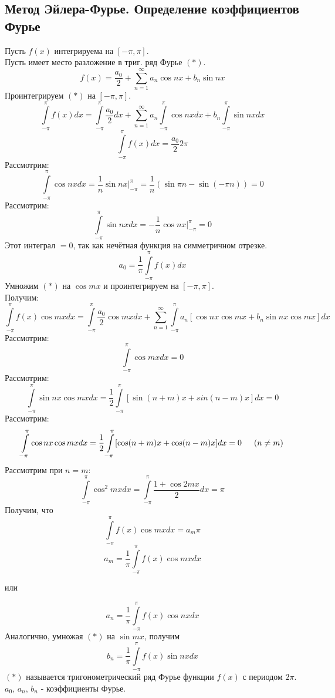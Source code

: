 \documentclass[12pt]{article}
\let\oldint\int
\let\oldsum\sum
\renewcommand{\int}{\oldint\limits}
\renewcommand{\sum}{\oldsum\limits}
\begin{document}
    \subsection{Метод Эйлера-Фурье. Определение коэффициентов Фурье}\noindent
    Пусть $f(x)$ интегрируема на $[-\pi, \pi]$.\\
    Пусть имеет место разложение в триг. ряд Фурье $(*)$.
    \[ f(x) = \frac{a_0}{2} + \sum_{n=1}^{\infty} a_n \cos nx + b_n \sin nx \]
    Проинтегрируем $(*)$ на $[-\pi, \pi]$.
    \[ \int_{-\pi}^{\pi} f(x)dx = \int_{-\pi}^{\pi} \frac{a_0}{2} dx + \sum_{n=1}^{\infty} a_n \int_{-\pi}^{\pi} \cos nx dx + b_n \int_{-\pi}^{\pi} \sin nx dx \]
    \[ \int_{-\pi}^{\pi} f(x)dx = \frac{a_0}{2} 2\pi \]
    Рассмотрим:
    \[ \int_{-\pi}^{\pi} \cos nx dx = \frac{1}{n} \sin nx \Big|^{\pi}_{-\pi} = \frac{1}{n} (\sin \pi n - \sin (-\pi n)) = 0 \]
    Рассмотрим:
    \[ \int_{-\pi}^{\pi} \sin nx dx = -\frac{1}{n} \cos nx \Big|^{\pi}_{-\pi} = 0 \]
    Этот интеграл $=0$, так как нечётная функция на симметричном отрезке.
    \[ a_0 = \frac{1}{\pi} \int_{-\pi}^{\pi} f(x) dx \]
    Умножим $(*)$ на $\cos mx$ и проинтегрируем на $[-\pi, \pi]$.\\
    Получим:
    \[ \int_{-\pi}^{\pi} f(x) \cos mx dx = \int_{-\pi}^{\pi} \frac{a_0}{2} \cos mx dx + \sum_{n=1}^{\infty} \int_{-\pi}^{\pi} a_n [ \cos nx \cos mx + b_n \sin nx \cos mx ]dx \]
    Рассмотрим:
    \[ \int_{-\pi}^{\pi} \cos mx dx = 0 \]
    Рассмотрим:
    \[ \int_{-\pi}^{\pi} \sin nx \cos mx dx = \frac{1}{2} \int_{-\pi}^{\pi} [ \sin(n+m)x + sin(n-m)x ]dx = 0 \]
    Рассмотрим:
    \[ \int_{-\pi}^{\pi} \cos nx \cos mx dx = \frac{1}{2} \int_{-\pi}^{\pi} [\cos (n+m)x + \cos (n-m)x ]dx = 0 \indent (n \neq m) \]
    Рассмотрим при $n = m$: 
    \[ \int_{-\pi}^{\pi} \cos^2 mx dx = \int_{-\pi}^{\pi} \frac{1+\cos 2mx}{2}dx = \pi \]
    Получим, что 
    \[ \int_{-\pi}^{\pi} f(x) \cos mx dx = a_m \pi \]
    \[ a_m = \frac{1}{\pi} \int_{-\pi}^{\pi} f(x) \cos mx dx \]
    \begin{center}
      или
    \end{center}
    \[ a_n = \frac{1}{\pi} \int_{-\pi}^{\pi} f(x) \cos nx dx \]
    Аналогично, умножая $(*)$ на $\sin mx$, получим
    \[ b_n = \frac{1}{\pi} \int_{-\pi}^{\pi} f(x) \sin nx dx \]
    $(*)$ называется тригонометрический ряд Фурье функции $f(x)$ с периодом $2\pi$.\\
    $a_0$, $a_n$, $b_n$ - коэффициенты Фурье.
  
\end{document}
